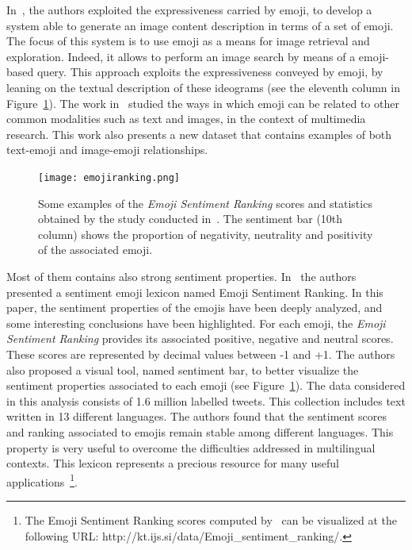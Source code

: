 In~\cite{cappallo2015image2emoji}, the authors exploited the expressiveness carried by emoji, to develop a system able to generate an image content description in terms of a set of emoji. The focus of this system is to use emoji as a means for image retrieval and exploration. Indeed, it allows to perform an image search by means of a emoji-based query.
This approach exploits the expressiveness conveyed by emoji, by leaning on the textual description of these ideograms (see the eleventh column in Figure~\ref{figEmojiranking}). 
The work in~\cite{CappalloTEMP18} studied the ways in which emoji can be related to other common modalities such as text and images, in the context of multimedia research. This work also presents a new dataset that contains examples of both text-emoji and image-emoji relationships.

\begin{figure}[t]
	\centering
	\texttt{[image: emojiranking.png]}
	\caption{Some examples of the \textit{Emoji Sentiment Ranking} scores and statistics obtained by the study conducted in~\cite{novak2015sentiment}. The sentiment bar (10th column) shows the proportion of negativity, neutrality and positivity of the associated emoji.}
	\label{figEmojiranking}
\end{figure}


Most of them contains also strong sentiment properties.
In~\cite{novak2015sentiment} the authors presented a sentiment emoji lexicon named Emoji Sentiment
Ranking. In this paper, the sentiment properties of the emojis have been deeply analyzed, and some interesting conclusions have been highlighted.
For each emoji, the \textit{Emoji Sentiment Ranking} provides its associated positive, negative and neutral scores. These scores are represented by decimal values between -1 and +1. The authors also proposed a visual tool, named sentiment bar, to better visualize the sentiment properties associated to each emoji (see Figure~\ref{figEmojiranking}).
The data considered in this analysis consists of 1.6 million labelled tweets.
This collection includes text written in 13 different languages. 
The authors found that the sentiment scores and ranking associated to emojis remain stable among different languages. This property is very useful to overcome the difficulties addressed in multilingual contexts.
This lexicon represents a precious resource for many useful applications~\footnote{The Emoji Sentiment Ranking scores computed by~\cite{novak2015sentiment} can be visualized at the following URL: http://kt.ijs.si/data/Emoji\_sentiment\_ranking/.}.

